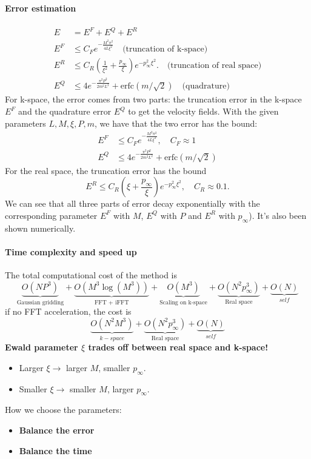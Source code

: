 \documentclass{article}[12pt]
\begin{document}
\paragraph{Error estimation}
\begin{align}
E & = E^F + E^Q + E^R \\
E^F & \le C_F e^{-\frac{M^2 \pi^2}{4 L \xi^2}} \quad  \text{(truncation of k-space)}\\
E^R & \le C_R (\frac{1}{\xi^2} + \frac{p_{\infty}}{\xi}) e^{-p_{\infty}^2 \xi^2}. \quad \text{(truncation of real space)} \\
E^Q & \le  4 e^{- \frac{\pi^2 P^2}{2 m^2 L^2}} + \text{erfc} (m / \sqrt{2}) \quad  \text{(quadrature)}
\end{align}
For k-space, the error comes from two parts: the truncation error in the k-space $E^F$ and the quadrature error $E^Q$ to get the velocity fields. With the given parameters  $L, M, \xi, P, m$, we have that the two error has the bound:
\begin{align}
E^F & \le C_F e^{-\frac{M^2 \pi^2}{4 L \xi^2}}, \quad C_F \approx 1 \\
E^Q & \le  4 e^{- \frac{\pi^2 P^2}{2 m^2 L^2}} + \text{erfc} (m / \sqrt{2})
\end{align}
For the real space, the truncation error has the bound
\begin{equation}
E^R \le C_R (\xi + \frac{p_{\infty}}{\xi}) e^{-p_{\infty}^2 \xi^2}, \quad C_R \approx 0.1.
\end{equation}
We can see that all three parts of error decay exponentially with the corresponding parameter $E^F$ with $M$, $E^Q$ with $P$ and $E^R$ with $p_{\infty}$). It's also been shown numerically.

\paragraph{Time complexity and speed up}
The total computational cost of the method is
\begin{equation}
\underbrace{O(NP^3)}_{\text{Gaussian gridding}} + \underbrace{O(M^3 \log(M^3))}_{\text{FFT + iFFT}} + \underbrace{O(M^3)}_{\text{Scaling on k-space}} + \underbrace{O(N^2 p_{\infty}^3)}_{\text{Real space}} + \underbrace{O(N)}_{self}
\end{equation}
if no FFT acceleration, the cost is
\begin{equation}
\underbrace{O(N^2M^3)}_{k-space} + \underbrace{O(N^2 p_{\infty}^3)}_{\text{Real space}} + \underbrace{O(N)}_{self}
\end{equation}
\textbf{Ewald parameter $\xi$ trades off between real space and k-space!}
\begin{itemize}
	\item Larger $\xi \rightarrow$ larger $M$, smaller $p_{\infty}$.
	\item Smaller $\xi \rightarrow$ smaller $M$, larger $p_{\infty}$.
\end{itemize}
How we choose the parameters:
\begin{itemize}
	\item \textbf{Balance the error} \\
	\item \textbf{Balance the time}
\end{itemize}
\end{document}
